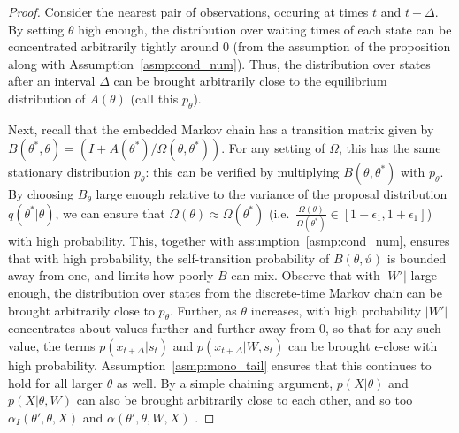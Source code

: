 \begin{proof}
Consider the nearest pair of observations, occuring at times $t$ and 
$t + \Delta$. %
By setting $\theta$ high enough, the distribution over waiting times 
of each state can be concentrated arbitrarily tightly around
$0$ (from the assumption of the proposition along with 
Assumption~\ref{asmp:cond_num}). Thus, the distribution over states after an 
interval $\Delta$ can be brought arbitrarily close to the equilibrium 
distribution of $A(\theta)$  (call this $p_{\theta}$).

Next, recall that the embedded Markov chain has a transition matrix 
given by $B(\theta^*,\theta) = (I + A(\theta^*)/\Omega(\theta,\theta^*))$. 
For any setting of $\Omega$, this has the same stationary distribution 
$p_{\theta}$: this can be verified by multiplying $B(\theta,\theta^*)$ with 
$p_\theta$. By choosing $B_\theta$ large enough relative to the variance 
of the proposal distribution $q(\theta^*|\theta)$, we can ensure that 
$\Omega(\theta) \approx \Omega(\theta^*)$ (i.e.\ $\frac{\Omega(\theta)}{
\Omega(\theta^*)} \in [1-\epsilon_1,1+\epsilon_1]$) with high probability.
This, together with assumption~\ref{asmp:cond_num}, ensures that with 
high probability, the self-transition probability of $B(\theta,\vartheta)$ 
is bounded away from one, and limits how poorly $B$ can mix.
Observe that with $|W'|$ large enough, the distribution over states 
from the discrete-time Markov chain can be brought arbitrarily close to 
$p_{\theta}$. Further, as $\theta$ increases, with high probability $|W'|$ 
concentrates about values further and further away from $0$, so that
 for any such value, the terms $p(x_{t+\Delta}|s_t)$ and 
 $p(x_{t+\Delta}|W,s_t)$ can be brought $\epsilon$-close with high
 probability.  Assumption~\ref{asmp:mono_tail} ensures that
this continues to hold for all larger $\theta$ as well.
By a simple chaining argument, $p(X|\theta)$ and $p(X|\theta,W)$ can also 
be brought arbitrarily close to each other, and
  so too $\alpha_I(\theta',\theta,X)$ and $\alpha(\theta',\theta,W,X)$
  .
\end{proof}

